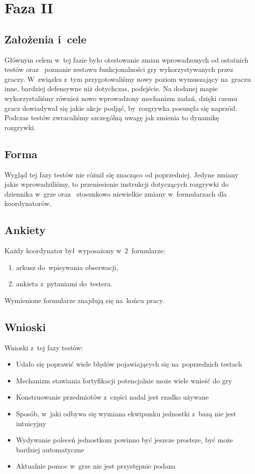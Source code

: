 \documentclass[licencjacka]{pracamgr}
\begin{document}
  \section{Faza II}

    \subsection{Założenia i~cele}
      Głównym celem w~tej fazie było otestowanie zmian wprowadzonych od ostatnich testów oraz~ poznanie zestawu funkcjonalności gry
      wykorzystywanych przez graczy. W~związku z~tym przygotowaliśmy nowy poziom wymuszający na~graczu inne, bardziej defensywne
      niż dotychczas, podejście. Na dodanej mapie wykorzystaliśmy również nowo wprowadzony mechanizm zadań, dzięki czemu gracz
      dowiadywał się jakie akcje podjąć, by~rozgrywka posunęła się naprzód. Podczas testów zwracaliśmy szczególną uwagę jak zmienia
      to dynamikę rozgrywki.

    \subsection{Forma}
      Wygląd tej fazy testów nie różnił się znacząco od poprzedniej. Jedyne zmiany jakie wprowadziliśmy,
      to przeniesienie instrukcji dotyczących rozgrywki do dziennika w~grze oraz~ stosunkowo niewielkie zmiany
      w~formularzach dla koordynatorów.

    \subsection{Ankiety}
      Każdy koordynator był~wyposażony w~2~formularze:
      \begin{enumerate}
	\item arkusz do~wpisywania obserwacji,
	\item ankieta z~pytaniami do~testera.
      \end{enumerate}

      \noindent
      Wymienione formularze znajdują się na~końcu pracy.

    \subsection{Wnioski}
      Wnioski z~tej fazy testów:
      \begin{itemize}
	\item Udało się poprawić wiele błędów pojawiających się na~poprzednich testach
	\item Mechanizm stawiania fortyfikacji potencjalnie może wiele wnieść do gry
	\item Konstruowanie przedmiotów z~części nadal jest rzadko używane
	\item Sposób, w~jaki odbywa się wymiana ekwipunku jednostki z~bazą nie jest intuicyjny
	\item Wydywanie poleceń jednostkom powinno być jeszcze prostsze, być może bardziej automatyczne
	\item Aktualnie pomoc w~grze nie jest przystępnie podana
      \end{itemize}
\end{document}
